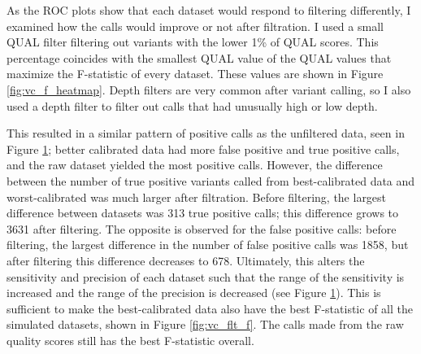 As the ROC plots show that each dataset would respond to filtering differently, I examined how the calls would improve or not after filtration. I used a small QUAL filter filtering out variants with the lower 1\% of QUAL scores. This percentage coincides with the smallest QUAL value of the QUAL values that maximize the F-statistic of every dataset. These values are shown in Figure \ref{fig:vc_f_heatmap}. Depth filters are very common after variant calling, so I also used a depth filter to filter out calls that had unusually high or low depth.


This resulted in a similar pattern of positive calls as the unfiltered data, seen in Figure \ref{fig:vc_flt_p}; better calibrated data had more false positive and true positive calls, and the raw dataset yielded the most positive calls. However, the difference between the number of true positive variants called from best-calibrated data and worst-calibrated was much larger after filtration. Before filtering, the largest difference between datasets was 313 true positive calls; this difference grows to 3631 after filtering. The opposite is observed for the false positive calls: before filtering, the largest difference in the number of false positive calls was 1858, but after filtering this difference decreases to 678. 
Ultimately, this alters the sensitivity and precision of each dataset such that the range of the sensitivity is increased and the range of the precision is decreased (see Figure \ref{fig:vc_flt_p}). This is sufficient to make the best-calibrated data also have the best F-statistic of all the simulated datasets, shown in Figure \ref{fig:vc_flt_f}. The calls made from the raw quality scores still has the best F-statistic overall.

\begin{figure}
\centering
{}
\label{fig:vc_flt_p}
\end{figure}

